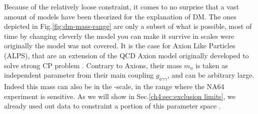 Because of the relatively loose constraint, it comes to no surprise that a vast amount of models have been theorized for the explanation of DM. The ones depicted in Fig.\ref{fig:dm-mass-range} are only a subset of what is possible, most of time by changing cleverly the model you can make it survive in scales were originally the model was not covered. It is the case for Axion Like Particles (ALPS), that are an extension of the QCD Axion model originally developed to solve strong CP problem \cite{PhysRevD.16.1791}. Contrary to Axions, their mass $m_a$ is taken as independent parameter from their main coupling $g_{a \gamma \gamma}$, and can be arbitrary large. Indeed this mass can also be in the \mev-\gev scale, in the range where the NA64 experiment is sensitive. As we will show in Sec.\ref{ch4:sec:exclusion limits}, we already used out data to constraint a portion of this parameter space \cite{Banerjee:2020fue}.


